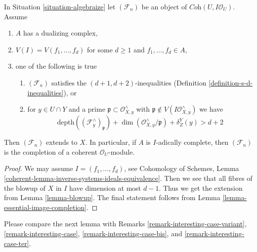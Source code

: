 \begin{proposition}
\label{proposition-d-generators}
In Situation \ref{situation-algebraize} let $(\mathcal{F}_n)$
be an object of $\textit{Coh}(U, I\mathcal{O}_U)$. Assume
\begin{enumerate}
\item $A$ has a dualizing complex,
\item $V(I) = V(f_1, \ldots, f_d)$ for some $d \geq 1$ and
$f_1, \ldots, f_d \in A$,
\item one of the following is true
\begin{enumerate}
\item $(\mathcal{F}_n)$ satisfies the $(d + 1, d + 2)$-inequalities
(Definition \ref{definition-s-d-inequalities}), or
\item for $y \in U \cap Y$ and a prime
$\mathfrak p \subset \mathcal{O}_{X, y}^\wedge$ with
$\mathfrak p \not \in V(I\mathcal{O}_{X, y}^\wedge)$
we have
$$
\text{depth}((\mathcal{F}^\wedge_y)_\mathfrak p) +
\dim(\mathcal{O}_{X, y}^\wedge/\mathfrak p) + \delta^Y_Z(y) > d + 2
$$
\end{enumerate}
\end{enumerate}
Then $(\mathcal{F}_n)$ extends to $X$. In particular, if $A$ is
$I$-adically complete, then $(\mathcal{F}_n)$ is the completion
of a coherent $\mathcal{O}_U$-module. 
\end{proposition}

\begin{proof}
We may assume $I = (f_1, \ldots, f_d)$, see
Cohomology of Schemes, Lemma
\ref{coherent-lemma-inverse-systems-ideals-equivalence}.
Then we see that
all fibres of the blowup of $X$ in $I$ have dimension at most $d - 1$.
Thus we get the extension from Lemma \ref{lemma-blowup}.
The final statement follows from Lemma \ref{lemma-essential-image-completion}.
\end{proof}

\noindent
Please compare the next lemma with
Remarks \ref{remark-interesting-case-variant},
\ref{remark-interesting-case},
\ref{remark-interesting-case-bis}, and
\ref{remark-interesting-case-ter}.

